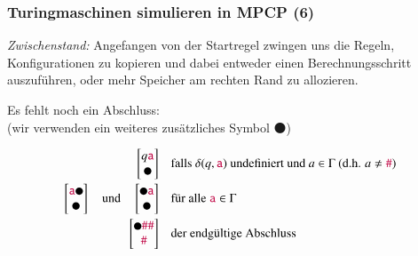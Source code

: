 \documentclass[aspectratio=1610,onlymath]{beamer}
\begin{document}
\begin{frame}\frametitle{Turingmaschinen simulieren in MPCP (6)}

\emph{Zwischenstand:} Angefangen von der Startregel zwingen uns die Regeln, Konfigurationen
zu kopieren und dabei entweder einen Berechnungsschritt auszuführen, oder mehr Speicher am
rechten Rand zu allozieren.
\bigskip\pause

Es fehlt noch ein \alert{Abschluss:}\\
{(wir verwenden ein weiteres zusätzliches Symbol $\medbullet$)}

\begin{align*}
\left[\begin{matrix}q\Sterm{a}\\\medbullet\end{matrix}\right]\quad
	& \text{falls $\delta(q,\Sterm{a})$ undefiniert und $a\in\Gamma$ (d.h. $a\neq\Sterm{\#}$)}\\
\left[\begin{matrix}\Sterm{a}\medbullet\\\medbullet\end{matrix}\right]\quad\text{und}\quad\left[\begin{matrix}\medbullet\Sterm{a}\\\medbullet\end{matrix}\right]\quad
	& \text{für alle $\Sterm{a}\in\Gamma$}\\
\left[\begin{matrix}\medbullet\Sterm{\#}\Sterm{\#}\\\Sterm{\#}\end{matrix}\right]\quad
	& \text{der endgültige Abschluss}
\end{align*}

\end{frame}
\end{document}
